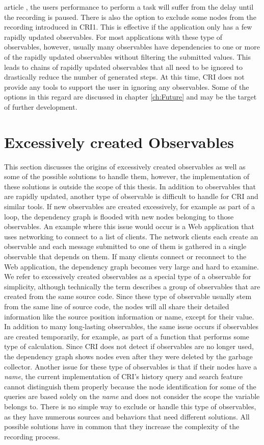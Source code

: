 article \cite{Perception}, the users performance to perform a task will suffer from the delay until the recording is paused.
There is also the option to exclude some nodes from the recording introduced in CRI1. This is effective if the application only has a few rapidly updated observables. For most applications with these type of observables, however, usually many observables have dependencies to one or more of the rapidly updated observables without filtering the submitted values. This leads to chains of rapidly updated observables that all need to be ignored to drastically reduce the number of generated steps. At this time, CRI does not provide any tools to support the user in ignoring any observables. Some of the options in this regard are discussed in chapter \ref{ch:Future} and may be the target of further development.

\section{Excessively created Observables}
\label{sec:DynamicallyCreated}
This section discusses the origins of excessively created observables as well as some of the possible solutions to handle them, however, the implementation of these solutions is outside the scope of this thesis.
In addition to observables that are rapidly updated, another type of observable is difficult to handle for CRI and similar tools. If new observables are created excessively, for example as part of a loop, the dependency graph is flooded with new nodes belonging to those observables. An example where this issue would occur is a Web application that uses networking to connect to a list of clients. The network clients each create an observable and each message submitted to one of them is gathered in a single observable that depends on them. If many clients connect or reconnect to the Web application, the dependency graph becomes very large and hard to examine. We refer to excessively created observables as a special type of a observable for simplicity, although technically the term describes a group of observables that are created from the same source code. Since these type of observable usually stem from the same line of source code, the nodes will all share their detailed information like the source position information or name, except for their value. In addition to many long-lasting observables, the same issue occurs if observables are created temporarily, for example, as part of a function that performs some type of calculation. Since CRI does not detect if observables are no longer used, the dependency graph shows nodes even after they were deleted by the garbage collector. Another issue for these type of observables is that if their nodes have a \emph{name}, the current implementation of CRI's history query and search feature cannot distinguish them properly because the node identification for some of the queries are based solely on the \emph{name} and does not consider the scope the variable belongs to.
There is no simple way to exclude or handle this type of observables, as they have numerous sources and behaviors that need different solutions. All possible solutions have in common that they increase the complexity of the recording process.

